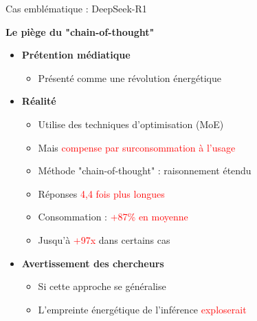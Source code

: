 \begin{frame}{Cas emblématique : DeepSeek-R1}

\textbf{Le piège du "chain-of-thought"}

\vspace{0.3cm}

\begin{itemize}
    \item<+-> \textbf{Prétention médiatique}
        \begin{itemize}
            \item Présenté comme une révolution énergétique
        \end{itemize}

    \vspace{0.2cm}
    \item<+-> \textbf{Réalité}
        \begin{itemize}
            \item Utilise des techniques d'optimisation (MoE)
            \item Mais \textcolor{red}{compense par surconsommation à l'usage}
            \item Méthode "chain-of-thought" : raisonnement étendu
            \item Réponses \textcolor{red}{4,4 fois plus longues}
            \item Consommation : \textcolor{red}{+87\% en moyenne}
            \item Jusqu'à \textcolor{red}{+97x} dans certains cas
        \end{itemize}

    \vspace{0.2cm}
    \item<+-> \textbf{Avertissement des chercheurs}
        \begin{itemize}
            \item Si cette approche se généralise
            \item L'empreinte énergétique de l'inférence \textcolor{red}{exploserait}
        \end{itemize}
\end{itemize}

\end{frame}

